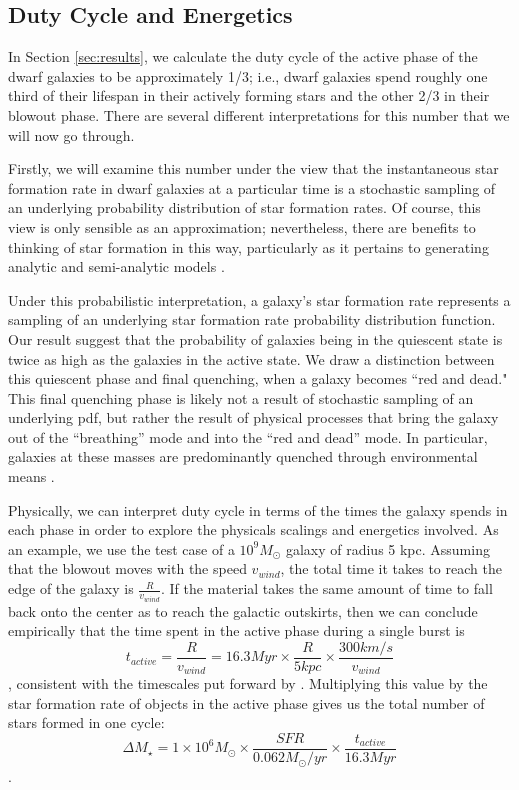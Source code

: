\documentclass[iop]{emulateapj}
\begin{document}
\subsection{Duty Cycle and Energetics}

In Section \ref{sec:results}, we calculate the duty cycle of the active phase of the dwarf galaxies to be approximately 1/3; i.e., dwarf galaxies spend roughly one third of their lifespan in their actively forming stars and the other 2/3 in their blowout phase. There are several different interpretations for this number that we will now go through.

Firstly, we will examine this number under the view that the instantaneous star formation rate in dwarf galaxies at a particular time is a stochastic sampling of an underlying probability distribution of star formation rates. Of course, this view is only sensible as an approximation; nevertheless, there are benefits to thinking of star formation in this way, particularly as it pertains to generating analytic and semi-analytic models \citep{Kelson16}. 

Under this probabilistic interpretation, a galaxy's star formation rate represents a sampling of an underlying star formation rate probability distribution function. Our result suggest that the probability of galaxies being in the quiescent state is twice as high as the galaxies in the active state. We draw a distinction between this quiescent phase and final quenching, when a galaxy becomes ``red and dead." This final quenching phase is likely not a result of stochastic sampling of an underlying pdf, but rather the result of physical processes that bring the galaxy out of the ``breathing'' mode and into the ``red and dead'' mode. In particular, galaxies at these masses are predominantly quenched through environmental means \citep{geha12}.

Physically, we can interpret duty cycle in terms of the times the galaxy spends in each phase in order to explore the physicals scalings and energetics involved. As an example, we use the test case of a $10^9 M_{\odot}$ galaxy of radius 5 kpc. Assuming that the blowout moves with the speed $v_{wind}$, the total time it takes to reach the edge of the galaxy is $\frac{R}{v_{wind}}$. If the material takes the same amount of time to fall back onto the center as to reach the galactic outskirts, then we can conclude empirically that the time spent in the active phase during a single burst is $$t_{active} = \frac{R}{v_{wind}} = 16.3 Myr \times \frac{R}{5 kpc}\times \frac{300 km/s}{v_{wind}}  $$, consistent with the timescales put forward by \cite{EB17}. Multiplying this value by the star formation rate of objects in the active phase gives us the total number of stars formed in one cycle:
$$\Delta M_{\star} = 1 \times 10^6 M_{\odot} \times \frac{SFR}{0.062 M_{\odot}/yr} \times \frac{t_{active}}{16.3 Myr}$$.
\end{document}
